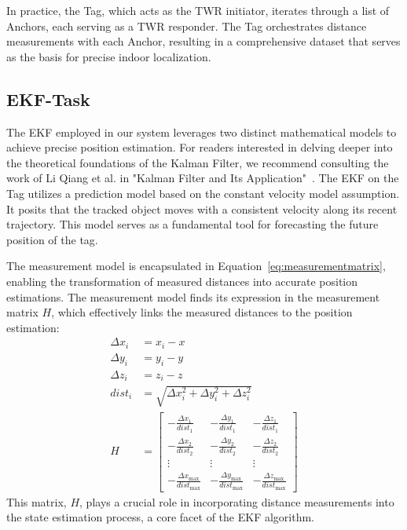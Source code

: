 \documentclass[10pt,a4paper,twocolumn]{article}
\begin{document}
In practice, the Tag, which acts as the TWR initiator,
iterates through a list of Anchors, each serving as a TWR responder.
The Tag orchestrates distance measurements with each Anchor,
resulting in a comprehensive dataset that serves as the basis for
precise indoor localization.

\subsection{EKF-Task}\label{section:firmware-ekf}
The \ac{EKF} employed in our system leverages two distinct mathematical models
to achieve precise position estimation.
For readers interested in delving deeper into the theoretical foundations of the
Kalman Filter, we recommend consulting the work of Li Qiang et al. in
"Kalman Filter and Its Application"~\cite{Kalman}.
The EKF  on the Tag utilizes a prediction model based on the constant velocity model assumption.
It posits that the tracked object moves with a consistent velocity along its recent
trajectory.
This model serves as a fundamental tool for forecasting the future position of the tag.

The measurement model is encapsulated in Equation~\ref{eq:measurementmatrix},
enabling the transformation of measured distances into accurate position estimations.
The measurement model finds its expression in the measurement matrix $H$,
which effectively links the measured distances to the position estimation:
\begin{equation}
  \begin{aligned}
    \Delta x_i &= x_i - x \\
    \Delta y_i &= y_i - y \\
    \Delta z_i &= z_i - z \\
    dist_i &= \sqrt{{\Delta x_i^2 + \Delta y_i^2 + \Delta z_i^2}} \\
    H &= \begin{bmatrix}
    -\frac{{\Delta x_1}}{{dist_1}} & -\frac{{\Delta y_1}}{{dist_1}} & -\frac{{\Delta z_1}}{{dist_1}} \\
    -\frac{{\Delta x_2}}{{dist_2}} & -\frac{{\Delta y_2}}{{dist_2}} & -\frac{{\Delta z_2}}{{dist_2}} \\
    \vdots & \vdots & \vdots \\
    -\frac{{\Delta x_{\text{max}}}}{{dist_{\text{max}}}} & -\frac{{\Delta y_{\text{max}}}}{{dist_{\text{max}}}} & -\frac{{\Delta z_{\text{max}}}}{{dist_{\text{max}}}}
    \end{bmatrix}
  \end{aligned}
  \label{eq:measurementmatrix}
\end{equation}
This matrix, $H$, plays a crucial role in incorporating distance measurements
into the state estimation process, a core facet of the EKF algorithm.
\end{document}
